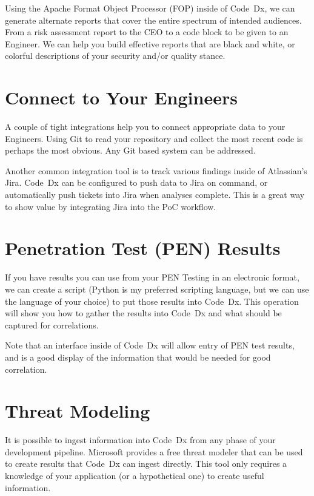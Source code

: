 \documentclass[11pt]{article}
\newcommand\codedx{{\color{blue}Code~Dx}\xspace}
\newcommand\MS{Microsoft\texttrademark\xspace}
\newcommand\python{Python\xspace}
\begin{document}
Using the Apache Format Object Processor (FOP) inside of \codedx, we can generate alternate
reports that cover the entire spectrum of intended audiences.  From a risk assessment report to the CEO 
to a code block to be given to an Engineer.  We can help you build effective reports that are black and
white, or colorful descriptions of your security and/or quality stance.

\section{Connect to Your Engineers}

A couple of tight integrations help you to connect appropriate data to your Engineers.  Using Git to read
your repository and collect the most recent code is perhaps the most obvious.  Any Git based system
can be addressed.

Another common integration tool is to track various findings inside of Atlassian's Jira.  \codedx can be
configured to push data to Jira on command, or automatically push tickets into Jira when analyses complete.
This is a great way to show value by integrating Jira into the PoC workflow.

\section{Penetration Test (PEN) Results}

If you have results you can use from your PEN Testing in an electronic format, we can create a script
(\python is my preferred scripting language, but we can use the language of your choice) to put those
results into \codedx.  This operation will show you how to gather the results into \codedx and what should
be captured for correlations.

Note that an interface inside of \codedx will allow entry of PEN test results, and is a good display of
the information that would be needed for good correlation.

\section{Threat Modeling}

It is possible to ingest information into \codedx from any phase of your development pipeline.  \MS
provides a free threat modeler that can be used to create results that \codedx can ingest directly.  This
tool only requires a knowledge of your application (or a hypothetical one) to create useful information.
\end{document}
